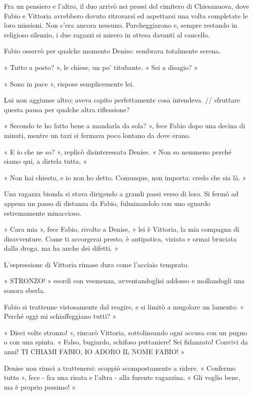 Fra un pensiero e l'altro, il duo arrivò nei pressi del cimitero di Chiesanuova, dove Fabio e Vittoria avrebbero dovuto ritrovarsi ed aspettarsi una volta completate le loro missioni. Non c'era ancora nessuno. Parcheggiarono e, sempre restando in religioso silenzio, i due ragazzi si misero in attesa davanti al cancello.

Fabio osservò per qualche momento Denise: sembrava totalmente serena.

« Tutto a posto? », le chiese, un po' titubante. « Sei a disagio? »

« Sono in pace », rispose semplicemente lei.

Lui non aggiunse altro; aveva capito perfettamente cosa intendeva.
// sfruttare questa pausa per qualche altra riflessione?

« Secondo te ho fatto bene a mandarla da sola? », fece Fabio dopo una decina di minuti, mentre un taxi si fermava poco lontano da dove erano.

« E io che ne so? », replicò disinteressata Denise. « Non so nemmeno perché siamo qui, a dirtela tutta. »

« Non hai chiesto, e io non ho detto. Comunque, non importa: credo che sia là. »

Una ragazza bionda si stava dirigendo a grandi passi verso di loro. Si fermò ad appena un passo di distanza da Fabio, fulminandolo con uno sguardo estremamente minaccioso.

« Cara mia », fece Fabio, rivolto a Denise, « lei è Vittoria, la mia compagna di disavventure. Come ti accorgerai presto, è antipatica, viziata e ormai bruciata dalla droga, ma ha anche dei difetti. »

L'espressione di Vittoria rimase dura come l'acciaio temprato.

« STRONZO! » esordì con veemenza, avventandoglisi addosso e mollandogli una sonora sberla.

Fabio si trattenne vistosamente dal reagire, e si limitò a mugolare un lamento: « Perché oggi mi schiaffeggiano tutti? »

« Dieci volte stronzo! », rincarò Vittoria, sottolineando ogni accusa con un pugno o con una spinta. « Falso, bugiardo, schifoso puttaniere! Sei fidanzato! Convivi da anni! TI CHIAMI FABIO, IO ADORO IL NOME FABIO! »

Denise non riuscì a trattenersi: scoppiò scompostamente a ridere. « Confermo tutto », fece - fra una risata e l'altra - alla furente ragazzina. « Gli voglio bene, ma è proprio pessimo! »

